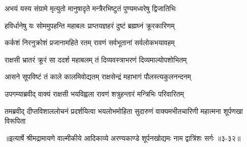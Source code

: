 \twolineshloka
{अभयं यस्य संग्रामे मृत्युतो मानुषादृते}
{मन्त्रैरभिष्टुतं पुण्यमध्वरेषु द्विजातिभिः} %

\twolineshloka
{हविर्धानेषु यः सोममुपहन्ति महाबलः}
{प्राप्तयज्ञहरं दुष्टं ब्रह्मघ्नं क्रूरकारिणम्} %

\twolineshloka
{कर्कशं निरनुक्रोशं प्रजानामहिते रतम्}
{रावणं सर्वभूतानां सर्वलोकभयावहम्} %

\twolineshloka
{राक्षसी भ्रातरं क्रूरं सा ददर्श महाबलम्}
{तं दिव्यवस्त्राभरणं दिव्यमाल्योपशोभितम्} %

\twolineshloka
{आसने सूपविष्टं तं काले कालमिवोद्यतम्}
{राक्षसेन्द्रं महाभागं पौलस्त्यकुलनन्दनम्} %

\twolineshloka
{उपगम्याब्रवीद् वाक्यं राक्षसी भयविह्वला}
{रावणं शत्रुहन्तारं मन्त्रिभिः परिवारितम्} %

\twolineshloka
{तमब्रवीद् दीप्तविशाललोचनं प्रदर्शयित्वा भयलोभमोहिता}
{सुदारुणं वाक्यमभीतचारिणी महात्मना शूर्पणखा विरूपिता} %


॥इत्यार्षे श्रीमद्रामायणे वाल्मीकीये आदिकाव्ये अरण्यकाण्डे शूर्पनखोद्यमः नाम द्वात्रिंशः सर्गः ॥३-३२॥
